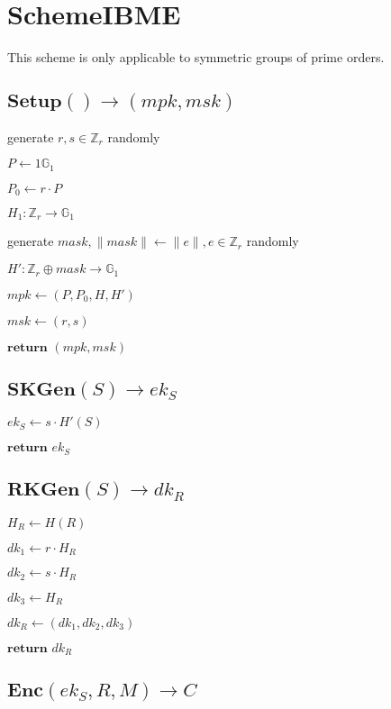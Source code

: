 \documentclass[a4paper]{article}
\begin{document}
\section{SchemeIBME}

This scheme is only applicable to symmetric groups of prime orders. 

\subsection{$\textbf{Setup}() \rightarrow (\textit{mpk}, \textit{msk})$}

generate $r, s \in \mathbb{Z}_r$ randomly

$P \gets 1{\mathbb{G}_1}$

$P_0 \gets r \cdot P$

$H_1: \mathbb{Z}_r \rightarrow \mathbb{G}_1$

generate $\textit{mask}, \|\textit{mask}\| \gets \|e\|, e \in \mathbb{Z}_r$ randomly

$H': \mathbb{Z}_r \oplus \textit{mask} \rightarrow \mathbb{G}_1$

$\textit{mpk} \gets (P, P_0, H, H')$

$\textit{msk} \gets (r, s)$

$\textbf{return }(\textit{mpk}, \textit{msk})$

\subsection{$\textbf{SKGen}(S) \rightarrow \textit{ek}_S$}

$\textit{ek}_S \gets s \cdot H'(S)$

$\textbf{return }\textit{ek}_S$

\subsection{$\textbf{RKGen}(S) \rightarrow \textit{dk}_R$}

$H_R \gets H(R)$

$\textit{dk}_1 \gets r \cdot H_R$

$\textit{dk}_2 \gets s \cdot H_R$

$\textit{dk}_3 \gets H_R$

$\textit{dk}_R \gets (\textit{dk}_1, \textit{dk}_2, \textit{dk}_3)$

$\textbf{return }\textit{dk}_R$

\subsection{$\textbf{Enc}(\textit{ek}_S, R, M) \rightarrow C$}
\end{document}
